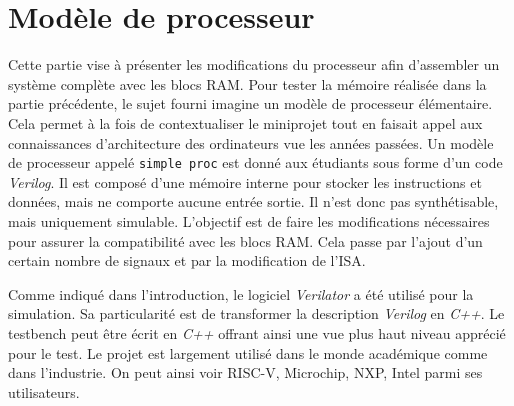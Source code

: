 \section{Modèle de processeur}

Cette partie vise à présenter les modifications du processeur afin d'assembler un système complète avec les blocs \gls{RAM}.
Pour tester la mémoire réalisée dans la partie précédente, le sujet fourni imagine un modèle de processeur élémentaire.
Cela permet à la fois de contextualiser le miniprojet tout en faisait appel aux connaissances d'architecture des ordinateurs vue les années passées.
Un modèle de processeur appelé \texttt{simple proc} est donné aux étudiants sous forme d'un code \textit{Verilog}.
Il est composé d'une mémoire interne pour stocker les instructions et données, mais ne comporte aucune entrée sortie.
Il n'est donc pas synthétisable, mais uniquement simulable.
L'objectif est de faire les modifications nécessaires pour assurer la compatibilité avec les blocs \gls{RAM}.
Cela passe par l'ajout d'un certain nombre de signaux et par la modification de l'\gls{ISA}. \\
\gap

Comme indiqué dans l'introduction, le logiciel \textit{Verilator} a été utilisé pour la simulation.
Sa particularité est de transformer la description \textit{Verilog} en \textit{C++}.
Le testbench peut être écrit en \textit{C++} offrant ainsi une vue plus haut niveau apprécié pour le test.
Le projet est largement utilisé dans le monde académique comme dans l'industrie.
On peut ainsi voir RISC-V, Microchip, NXP, Intel parmi ses utilisateurs.


